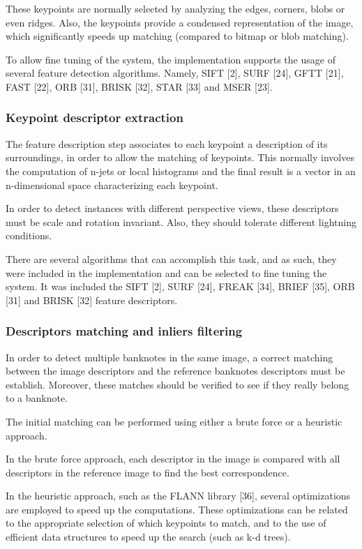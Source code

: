These keypoints are normally selected by analyzing the edges, corners, blobs or even ridges. Also, the keypoints provide a condensed representation of the image, which significantly speeds up matching (compared to bitmap or blob matching).

To allow fine tuning of the system, the implementation supports the usage of several feature detection algorithms. Namely, SIFT [2], SURF [24], GFTT [21], FAST [22], ORB [31], BRISK [32], STAR [33] and MSER [23].


\subsubsection{Keypoint descriptor extraction}

The feature description step associates to each keypoint a description of its surroundings, in order to allow the matching of keypoints. This normally involves the computation of n-jets or local histograms and the final result is a vector in an n-dimensional space characterizing each keypoint.

In order to detect instances with different perspective views, these descriptors must be scale and rotation invariant. Also, they should tolerate different lightning conditions.

There are several algorithms that can accomplish this task, and as such, they were included in the implementation and can be selected to fine tuning the system. It was included the SIFT [2], SURF [24], FREAK [34], BRIEF [35], ORB [31] and BRISK [32] feature descriptors.


\subsubsection{Descriptors matching and inliers filtering}

In order to detect multiple banknotes in the same image, a correct matching between the image descriptors and the reference banknotes descriptors must be establish. Moreover, these matches should be verified to see if they really belong to a banknote.

The initial matching can be performed using either a brute force or a heuristic approach.

In the brute force approach, each descriptor in the image is compared with all descriptors in the reference image to find the best correspondence.

In the heuristic approach, such as the FLANN library [36], several optimizations are employed to speed up the computations. These optimizations can be related to the appropriate selection of which keypoints to match, and to the use of efficient data structures to speed up the search (such as k-d trees).

